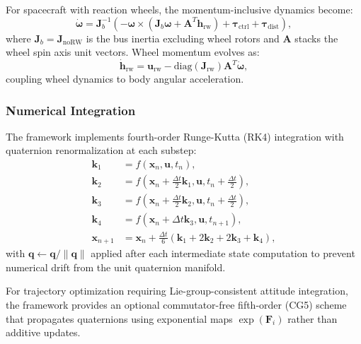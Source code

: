 \documentclass[conference]{IEEEtran}
\begin{document}
For spacecraft with reaction wheels, the momentum-inclusive dynamics become:
\begin{equation}
\label{eq:av_dynamics_reduced}
\dot{\boldsymbol{\omega}} = \mathbf{J}_b^{-1}\left(-\boldsymbol{\omega}\times \left(\mathbf{J}_b\boldsymbol{\omega} +\mathbf{A}^T\mathbf{h}_{\text{rw}}\right)+\boldsymbol{\tau}_{\text{ctrl}} + \boldsymbol{\tau}_{\text{dist}} \right),
\end{equation}
where $\mathbf{J}_b = \mathbf{J}_{\text{noRW}}$ is the bus inertia excluding wheel rotors and $\mathbf{A}$ stacks the wheel spin axis unit vectors. Wheel momentum evolves as:
\begin{equation}
\dot{\mathbf{h}}_{\text{rw}} = \mathbf{u}_{\text{rw}} - \text{diag}(\mathbf{J}_{\text{rw}}) \mathbf{A}^T \dot{\boldsymbol{\omega}},
\end{equation}
coupling wheel dynamics to body angular acceleration.

\subsubsection{Numerical Integration}
The framework implements fourth-order Runge-Kutta (RK4) integration with quaternion renormalization at each substep:
\begin{align}
\mathbf{k}_1 &= f(\mathbf{x}_n, \mathbf{u}, t_n), \\
\mathbf{k}_2 &= f\left(\mathbf{x}_n + \tfrac{\Delta t}{2}\mathbf{k}_1, \mathbf{u}, t_n + \tfrac{\Delta t}{2}\right), \\
\mathbf{k}_3 &= f\left(\mathbf{x}_n + \tfrac{\Delta t}{2}\mathbf{k}_2, \mathbf{u}, t_n + \tfrac{\Delta t}{2}\right), \\
\mathbf{k}_4 &= f(\mathbf{x}_n + \Delta t \mathbf{k}_3, \mathbf{u}, t_{n+1}), \\
\mathbf{x}_{n+1} &= \mathbf{x}_n + \tfrac{\Delta t}{6}(\mathbf{k}_1 + 2\mathbf{k}_2 + 2\mathbf{k}_3 + \mathbf{k}_4),
\end{align}
with $\mathbf{q} \leftarrow \mathbf{q}/\|\mathbf{q}\|$ applied after each intermediate state computation to prevent numerical drift from the unit quaternion manifold.

For trajectory optimization requiring Lie-group-consistent attitude integration, the framework provides an optional commutator-free fifth-order (CG5) scheme that propagates quaternions using exponential maps $\exp(\mathbf{F}_i)$ rather than additive updates.
\end{document}
